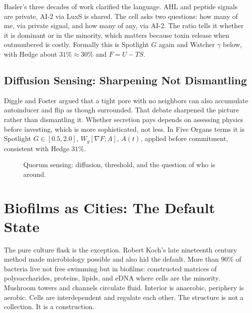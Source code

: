 \documentclass[11pt,a4paper]{article}
\begin{document}
Basler's three decades of work clarified the language. AHL and peptide signals are private, AI-2 via LuxS is shared. The cell asks two questions: how many of me, via private signal, and how many of any, via AI-2. The ratio tells it whether it is dominant or in the minority, which matters because toxin release when outnumbered is costly. Formally this is Spotlight $G$ again and Watcher $\gamma$ below, with Hedge about $31\% \approx 30\%$ and $F = U - TS$.

\subsection{Diffusion Sensing: Sharpening Not Dismantling}

Diggle and Foster argued that a tight pore with no neighbors can also accumulate autoinducer and flip as though surrounded. That debate sharpened the picture rather than dismantling it. Whether secretion pays depends on assessing physics before investing, which is more sophisticated, not less. In Five Organs terms it is Spotlight $G \in [0.5,2.0]$, $W_g[\nabla F; A]$, $A(t)$, applied before commitment, consistent with Hedge $31\%$.

\begin{figure}[h]
\centering
{}
\caption{Quorum sensing: diffusion, threshold, and the question of who is around.}
\label{fig:quorum}
\end{figure}

\section{Biofilms as Cities: The Default State}
\label{sec:biofilm}

The pure culture flask is the exception. Robert Koch's late nineteenth century method made microbiology possible and also hid the default. More than $90\%$ of bacteria live not free swimming but in biofilms: constructed matrices of polysaccharides, proteins, lipids, and eDNA where cells are the minority. Mushroom towers and channels circulate fluid. Interior is anaerobic, periphery is aerobic. Cells are interdependent and regulate each other. The structure is not a collection. It is a construction.
\end{document}
